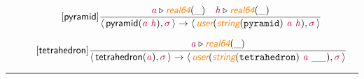\documentclass[10pt,leqno,fleqn]{article}
\newcommand{\artVariable}[1]{\mbox{\color{purple}\em #1\/}}
\newcommand{\artConstructor}[1]{\mbox{\sf #1}}
\newcommand{\artCaseInsensitiveLiteral}[1]{\mbox{\tt #1}}
\newcommand{\artSpecial}[1]{\mbox{\color{orange}\sf\em #1}}
\begin{document}
\begin{equation}
\tag*{[\artConstructor{\sf pyramid}]}
\begin{split}\frac{ \artVariable{a}\triangleright \artSpecial{real64}(\_) \quad  \artVariable{h}\triangleright \artSpecial{real64}(\_) }{\langle\, \artConstructor{\sf pyramid}(\artVariable{a}\ \artVariable{h}), \artVariable{$\sigma$}\,\rangle \rightarrow \langle\, \artSpecial{user}(\artSpecial{string}(\artCaseInsensitiveLiteral{pyramid})\ \artVariable{a}\ \artVariable{h}), \artVariable{$\sigma$}\,\rangle }
\end{split}
\end{equation}

\begin{equation}
\tag*{[\artConstructor{\sf tetrahedron}]}
\begin{split}\frac{ \artVariable{a}\triangleright \artSpecial{real64}(\_) }{\langle\, \artConstructor{\sf tetrahedron}(\artVariable{a}), \artVariable{$\sigma$}\,\rangle \rightarrow \langle\, \artSpecial{user}(\artSpecial{string}(\artCaseInsensitiveLiteral{tetrahedron})\ \artVariable{a}\ \_\_), \artVariable{$\sigma$}\,\rangle }
\end{split}
\end{equation}

\hrule
\end{document}
